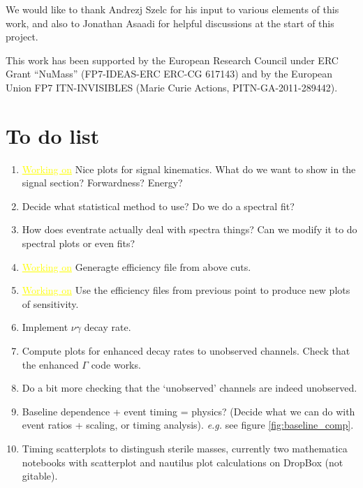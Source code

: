 \documentclass[11pt, a4paper]{article}
\newcommand{\newtext}[2]{\textcolor{#1}{\ul{#2}}}
\begin{document}
\acknowledgments

We would like to thank Andrezj Szelc for his input to various elements of this
work, and also to Jonathan Asaadi for helpful discussions at the start of this
project.

This work has been supported by the European Research Council under ERC Grant
“NuMass” (FP7-IDEAS-ERC ERC-CG 617143) and by the European Union FP7
ITN-INVISIBLES (Marie Curie Actions, PITN-GA-2011-289442).

\appendix

\section{To do list}

\begin{enumerate}

	\item \newtext{MARK}{Working on} Nice plots for signal kinematics. What do we want to show in the signal
section? Forwardness? Energy? 

\item Decide what statistical method to use? Do we do a spectral fit?

\item How does eventrate actually deal with spectra things? Can we modify it to 
do spectral plots or even fits?


\item \newtext{MARK}{Working on} Generagte efficiency file from above cuts.

\item \newtext{MARK}{Working on} Use the efficiency files from previous point to produce new plots of
sensitivity.

\item Implement $\nu\gamma$ decay rate. 

\item Compute plots for enhanced decay rates to unobserved channels. Check that
the enhanced $\Gamma$ code works.

\item Do a bit more checking that the `unobserved' channels are indeed unobserved.

\item Baseline dependence + event timing = physics? (Decide what we can do with
event ratios + scaling, or timing analysis).  \emph{e.g.} see figure
\ref{fig:baseline_comp}.

\item Timing scatterplots to distingush sterile masses, currently two mathematica notebooks with scatterplot and nautilus plot calculations on DropBox (not gitable).


\end{enumerate}
\end{document}
